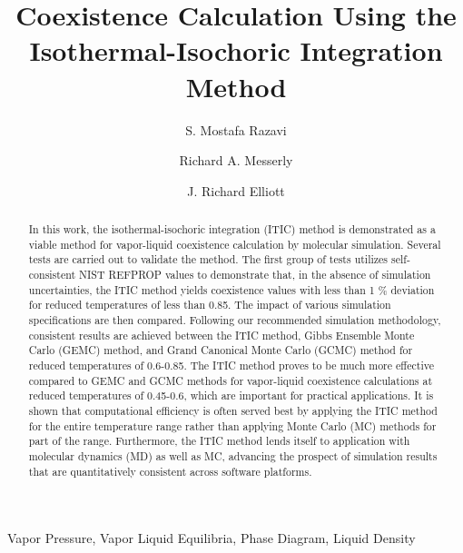 \documentclass[5p,times]{elsarticle}
\begin{document}
\begin{frontmatter}

\title{Coexistence Calculation Using the Isothermal-Isochoric Integration Method}

\author{S. Mostafa Razavi}
\address{Department of Chemical and Biomolecular Engineering, The University of Akron, Akron, Ohio 44325, USA}

\author{Richard A. Messerly}
\address{Thermodynamics Research Center, National Institute of Standards and Technology, Boulder, Colorado 80305, USA}



\author{J. Richard Elliott }
\address{Department of Chemical and Biomolecular Engineering, The University of Akron, Akron, Ohio 44325, USA}

\begin{abstract}
In this work, the isothermal-isochoric integration (ITIC) method is demonstrated as a viable method for vapor-liquid coexistence calculation by molecular simulation. Several tests are carried out to validate the method. The first group of tests utilizes self-consistent NIST REFPROP values to demonstrate that, in the absence of simulation uncertainties, the ITIC method yields coexistence values with less than 1 \% deviation for reduced temperatures of less than 0.85. The impact of various simulation specifications are then compared. Following our recommended simulation methodology, consistent results are achieved between the ITIC method, Gibbs Ensemble Monte Carlo (GEMC) method, and Grand Canonical Monte Carlo (GCMC) method for reduced temperatures of 0.6-0.85. The ITIC method proves to be much more effective compared to GEMC and GCMC methods for vapor-liquid coexistence calculations at reduced temperatures of 0.45-0.6, which are important for practical applications. It is shown that computational efficiency is often served best by applying the ITIC method for the entire temperature range rather than applying Monte Carlo (MC) methods for part of the range. Furthermore, the ITIC method lends itself to application with molecular dynamics (MD) as well as MC, advancing the prospect of simulation results that are quantitatively consistent across software platforms.
\end{abstract}

\begin{keyword}
Vapor Pressure, Vapor Liquid Equilibria, Phase Diagram, Liquid Density
\end{keyword}

\end{frontmatter}
\end{document}
